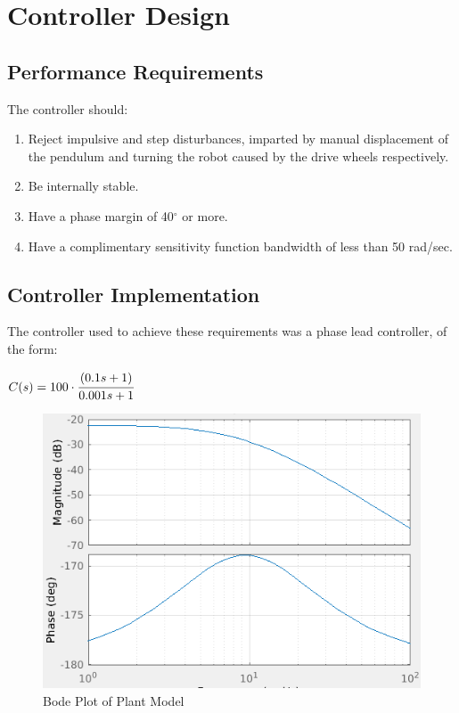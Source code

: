 \documentclass[11pt, a4paper,twocolumn]{article}
\begin{document}
\section{	Controller Design	}\label{sec:design}

	\subsection{	Performance Requirements	}
	The controller should:
	\begin{enumerate}
	\item Reject impulsive and step disturbances, imparted by manual displacement of the pendulum and turning the robot caused by the drive wheels respectively.
	\item Be internally stable.
	\item Have a phase margin of 40$^\circ$ or more.
	\item Have a complimentary sensitivity function bandwidth of less than 50 rad/sec.
	\end{enumerate}
	
	\subsection{	Controller Implementation	}

	The controller used to achieve these requirements was a phase lead controller, of the form:
	\begin{center}
		$ C(s) = 100 \cdot \cfrac{(0.1s + 1)}{0.001s + 1} $
	\end{center}
		\begin{figure}[h!]
			\centering
			\includegraphics[scale=0.4]{bode_plant}
			\caption{Bode Plot of Plant Model}
			\label{fig:bode_plnt}
		\end{figure}
\end{document}
